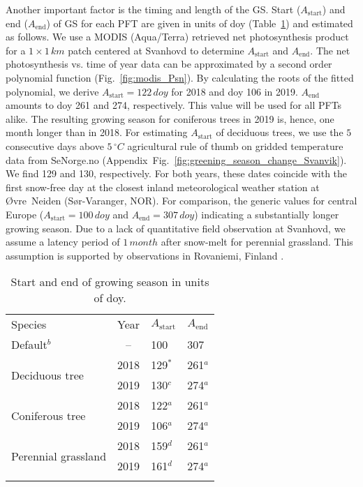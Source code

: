\documentclass[bg, manuscript]{copernicus}
\begin{document}
Another important factor is the timing and length of the GS. Start ($A_\text{start}$) and end ($A_\text{end}$) of GS for each PFT are given in units of \unit{doy} (Table~\ref{tab:sensitivity_tests_gs}) and estimated as follows. We use a MODIS (Aqua/Terra) retrieved net photosynthesis product \citep{MODIS_PSN} for a $1\times 1\,\unit{km}$ patch centered at Svanhovd to determine $A_\text{start}$ and $A_\text{end}$. The net photosynthesis vs. time of year data can be approximated by a second order polynomial function (Fig.~\ref{fig:modis_Psn}). By calculating the roots of the fitted polynomial, we derive $A_\text{start} = 122\,\unit{doy}$ for 2018 and \unit{doy} 106 in 2019. $A_\text{end}$ amounts to \unit{doy} 261 and 274, respectively. This value will be used for all PFTs alike. The resulting growing season for coniferous trees in 2019 is, hence, one month longer than in 2018. For estimating $A_\text{start}$ of deciduous trees, we use the $5$ consecutive days above $5\,\unit{^\circ C}$ agricultural rule of thumb on gridded temperature data from SeNorge.no (Appendix~Fig.~\ref{fig:greening_season_change_Svanvik}). We find 129 and 130, respectively. For both years, these dates coincide with the first snow-free day at the closest inland meteorological weather station at Øvre~Neiden (Sør-Varanger, NOR). For comparison, the generic values for central Europe ($A_\mathrm{start} = 100\,\unit{doy}$ and $A_\mathrm{end} = 307\,\unit{doy}$) indicating a substantially longer growing season. Due to a lack of quantitative field observation at Svanhovd, we assume a latency period of $1\,\unit{month}$ after snow-melt for perennial grassland. This assumption is supported by observations in Rovaniemi, Finland \citep[][Supplement~Fig.~S1]{FCR:Korhonen2018}.

\begin{table}[t]
  \caption{Start and end of growing season in units of \unit{doy}.}
  \label{tab:sensitivity_tests_gs}
  \begin{tabular}{lcll}
    \tophline
    Species & Year & $A_\mathrm{start}$ & $A_\mathrm{end}$\\
    \middlehline
    Default$^b$ & -- & 100 & 307\\
    \multirow{2}{*}{Deciduous tree} & 2018 & 129$^*$ & 261$^a$ \\
    & 2019 & 130$^c$ & 274$^a$ \\
    \multirow{2}{*}{Coniferous tree} & 2018 & 122$^a$ & 261$^a$ \\
    & 2019 & 106$^a$ & 274$^a$ \\
    \multirow{2}{*}{Perennial grassland} & 2018 & 159$^d$ & 261$^a$\\
    & 2019 & 161$^d$ & 274$^a$ \\
    \bottomhline
  \end{tabular}
\end{table}
\end{document}
